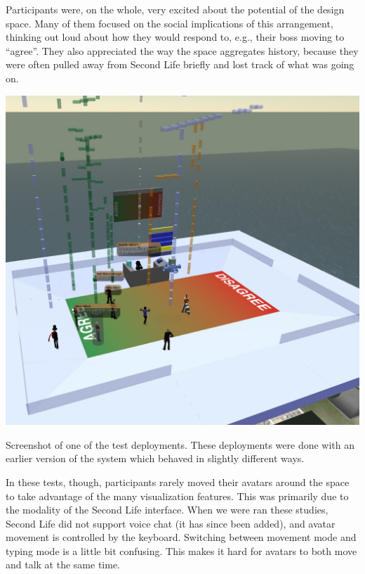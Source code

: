 Participants were, on the whole, very excited about the potential of the design space. Many of them focused on the social implications of this arrangement, thinking out loud about how they would respond to, e.g., their boss moving to ``agree''. They also appreciated the way the space aggregates history, because they were often pulled away from Second Life briefly and lost track of what was going on.

\begin{marginfigure}
	\includegraphics{figures/meeting_space_trial_2.jpg}
	\caption{Screenshot of one of the test deployments. These deployments were done with an earlier version of the system which behaved in slightly different ways.}
	\label{fig:meeting_space_trial_2}
\end{marginfigure}

In these tests, though, participants rarely moved their avatars around the space to take advantage of the many visualization features. This was primarily due to the modality of the Second Life interface. When we were ran these studies, Second Life did not support voice chat (it has since been added), and avatar movement is controlled by the keyboard. Switching between movement mode and typing mode is a little bit confusing. This makes it hard for avatars to both move and talk at the same time.

